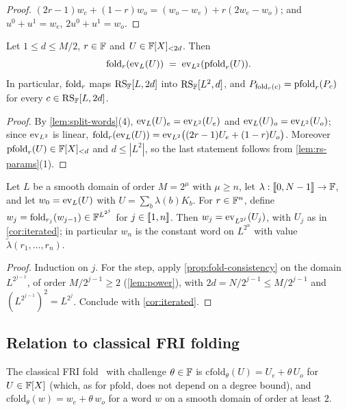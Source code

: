 \begin{proof}
$(2r-1)w_e + (1-r)w_o = (w_o - w_e) + r(2w_e - w_o)$; and $u^0 + u^1 = w_e$, $2u^0 + u^1 = w_o$.
\end{proof}

\begin{proposition}\label{prop:fold-consistency}
Let $1 \le d \le M/2$, $r \in \mathbb{F}$ and $U \in \mathbb{F}[X]_{<2d}$. Then
\[
  \mathrm{fold}_r(\mathrm{ev}_L(U)) \;=\; \mathrm{ev}_{L^2}(\mathrm{pfold}_r(U)).
\]
In particular, $\mathrm{fold}_r$ maps $\mathrm{RS}_{\mathbb{F}}[L,2d]$ into $\mathrm{RS}_{\mathbb{F}}[L^2,d]$, and $P_{\mathrm{fold}_r(c)} = \mathrm{pfold}_r(P_c)$ for every $c \in \mathrm{RS}_{\mathbb{F}}[L,2d]$.
\end{proposition}

\begin{proof}
By \cref{lem:split-words}(4), $\mathrm{ev}_L(U)_e = \mathrm{ev}_{L^2}(U_e)$ and $\mathrm{ev}_L(U)_o = \mathrm{ev}_{L^2}(U_o)$; since $\mathrm{ev}_{L^2}$ is linear, $\mathrm{fold}_r(\mathrm{ev}_L(U)) = \mathrm{ev}_{L^2}\bigl((2r-1)U_e + (1-r)U_o\bigr)$.
Moreover $\mathrm{pfold}_r(U) \in \mathbb{F}[X]_{<d}$ and $d \le |L^2|$, so the last statement follows from \cref{lem:rs-params}(1).
\end{proof}

\begin{corollary}\label{cor:codeword-fold}
Let $L$ be a smooth domain of order $M = 2^{\mu}$ with $\mu \ge n$, let $\lambda : \llbracket 0, N-1 \rrbracket \to \mathbb{F}$, and let $w_0 = \mathrm{ev}_L(U)$ with $U = \sum_b \lambda(b) K_b$.
For $r \in \mathbb{F}^n$, define $w_j = \mathrm{fold}_{r_j}(w_{j-1}) \in \mathbb{F}^{L^{2^j}}$ for $j \in \llbracket 1, n \rrbracket$.
Then $w_j = \mathrm{ev}_{L^{2^j}}(U_j)$, with $U_j$ as in \cref{cor:iterated}; in particular $w_n$ is the constant word on $L^{2^n}$ with value $\tilde\lambda(r_1,\dots,r_n)$.
\end{corollary}

\begin{proof}
Induction on $j$. For the step, apply \cref{prop:fold-consistency} on the domain $L^{2^{j-1}}$, of order $M/2^{j-1} \ge 2$ (\cref{lem:power}), with $2d = N/2^{j-1} \le M/2^{j-1}$ and $(L^{2^{j-1}})^2 = L^{2^j}$. Conclude with \cref{cor:iterated}.
\end{proof}

\subsection{Relation to classical FRI folding}\label{sec:fold:fri}

\begin{definition}\label{def:cfold}
The classical FRI fold~\cite{BBHR18} with challenge $\theta \in \mathbb{F}$ is $\mathrm{cfold}_\theta(U) = U_e + \theta\, U_o$ for $U \in \mathbb{F}[X]$ (which, as for $\mathrm{pfold}$, does not depend on a degree bound), and $\mathrm{cfold}_\theta(w) = w_e + \theta\, w_o$ for a word $w$ on a smooth domain of order at least $2$.
\end{definition}

